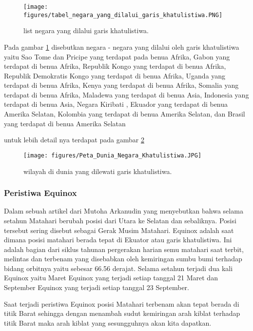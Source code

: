\begin{figure}[ht]
\centerline{\texttt{[image: figures/tabel\_negara\_yang\_dilalui\_garis\_khatulistiwa.PNG]}}
\caption{list negara yang dilalui garis khatulistiwa.}
\label{tabel_negara_yang_dilalui_garis_khatulistiwa}
\end{figure}


	Pada gambar \ref{tabel_negara_yang_dilalui_garis_khatulistiwa} disebutkan negara - negara yang dilalui oleh garis khatulistiwa yaitu Sao Tome dan Pricipe 
yang terdapat pada benua Afrika, Gabon yang terdapat di benua Afrika, Republik Kongo yang terdapat di benua Afrika, Republik Demokratis Kongo yang terdapat 
di benua Afrika, Uganda yang terdapat di benua Afrika, Kenya yang terdapat di benua Afrika, Somalia yang terdapat di benua Afrika, Maladewa yang terdapat 
di benua Asia, Indonesia yang terdapat di benua Asia, Negara Kiribati , Ekuador yang terdapat di benua Amerika Selatan, Kolombia 
yang terdapat di benua Amerika Selatan, dan Brasil yang terdapat di benua Amerika Selatan
	
	untuk lebih detail nya terdapat pada gambar \ref{Peta_Dunia_Negara_Khatulistiwa}

	
\begin{figure}[ht]
\centerline{\texttt{[image: figures/Peta\_Dunia\_Negara\_Khatulistiwa.JPG]}}
\caption{wilayah di dunia yang dilewati garis khatulistiwa.}
\label{Peta_Dunia_Negara_Khatulistiwa}
\end{figure}

\subsubsection {Peristiwa Equinox}

	Dalam sebuah artikel dari Mutoha Arkanudin yang menyebutkan bahwa selama setahun Matahari berubah posisi dari Utara ke Selatan dan sebaliknya. 
Posisi tersebut sering disebut sebagai Gerak Musim Matahari. Equinox adalah saat dimana posisi matahari berada tepat di Ekuator atau garis khatulistiwa. 
Ini adalah bagian dari siklus tahunan pergerakan harian semu matahari saat terbit, melintas dan terbenam yang disebabkan oleh kemiringan sumbu bumi
terhadap bidang orbitnya yaitu sebesar 66.56 derajat. Selama setahun terjadi dua kali Equinox yaitu Maret Equinox yang terjadi setiap tanggal 21 Maret dan September
Equinox yang terjadi setiap tanggal 23 September. 

	Saat terjadi peristiwa Equinox posisi Matahari terbenam akan tepat berada di titik Barat sehingga dengan menambah sudut kemiringan arah kiblat 
terhadap titik Barat maka arah kiblat yang sesungguhnya akan kita dapatkan. 

